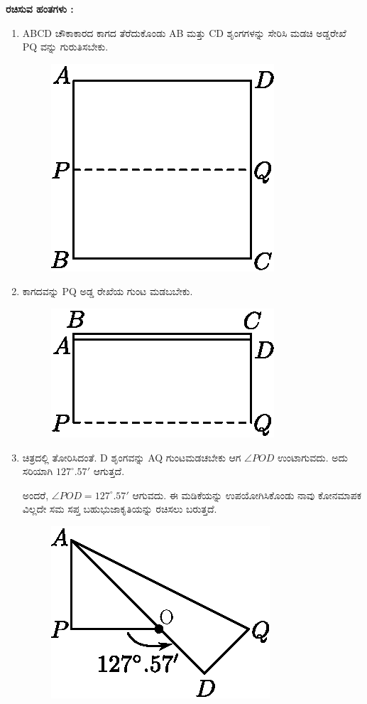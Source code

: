 \noindent
\textbf{ರಚಿಸುವ ಹಂತಗಳು :}
\begin{enumerate}
\item ABCD ಚೌಕಾಕಾರದ ಕಾಗದ ತೆರೆದುಕೊಂಡು  AB ಮತ್ತು CD  ಶೃಂಗಗಳನ್ನು ಸೇರಿಸಿ ಮಡಚಿ ಅಡ್ಡರೇಖೆ PQ ವನ್ನು ಗುರುತಿಸಬೇಕು.
\begin{figure}[H]
\centering
\includegraphics[scale=.9]{src/figure/chap1/fig1-11a.eps}
\end{figure}

\item ಕಾಗದವನ್ನು PQ ಅಡ್ಡ ರೇಖೆಯ ಗುಂಟ ಮಡಬಬೇಕು.  
\begin{figure}[H]
\centering
\includegraphics[scale=.9]{src/figure/chap1/fig1-11b.eps}
\end{figure}

\item ಚಿತ್ರದಲ್ಲಿ ತೋರಿಸಿದಂತೆ. D ಶೃಂಗವನ್ನು AQ ಗುಂಟಮಡಚಬೇಕು ಆಗ  $\angle POD$ ಉಂಟಾಗುವದು. ಅದು ಸರಿಯಾಗಿ $127^\circ.57'$ ಆಗುತ್ತದೆ. 

ಅಂದರೆ, $\angle POD = 127^\circ.57'$ ಆಗುವದು. ಈ ಮಡಿಕೆಯನ್ನು ಉಪಯೋಗಿಸಿಕೊಂಡು ನಾವು ಕೋನಮಾಪಕ ವಿಲ್ಲದೇ ಸಮ ಸಪ್ತ ಬಹುಭುಜಾಕೃತಿಯನ್ನು ರಚಿಸಲು ಬರುತ್ತದೆ. 
\begin{figure}[H]
\centering
\includegraphics[scale=.9]{src/figure/chap1/fig1-11c.eps}
\end{figure}
\end{enumerate}

